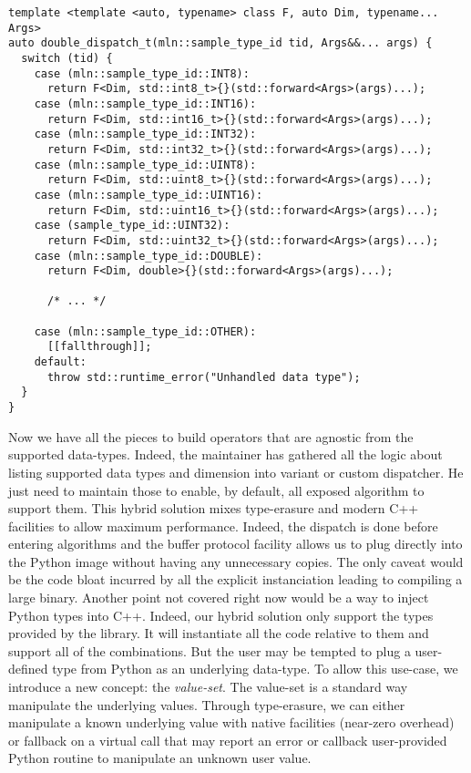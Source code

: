 \begin{verbatim}
template <template <auto, typename> class F, auto Dim, typename... Args>
auto double_dispatch_t(mln::sample_type_id tid, Args&&... args) {
  switch (tid) {
    case (mln::sample_type_id::INT8):
      return F<Dim, std::int8_t>{}(std::forward<Args>(args)...);
    case (mln::sample_type_id::INT16):
      return F<Dim, std::int16_t>{}(std::forward<Args>(args)...);
    case (mln::sample_type_id::INT32):
      return F<Dim, std::int32_t>{}(std::forward<Args>(args)...);
    case (mln::sample_type_id::UINT8):
      return F<Dim, std::uint8_t>{}(std::forward<Args>(args)...);
    case (mln::sample_type_id::UINT16):
      return F<Dim, std::uint16_t>{}(std::forward<Args>(args)...);
    case (sample_type_id::UINT32):
      return F<Dim, std::uint32_t>{}(std::forward<Args>(args)...);
    case (mln::sample_type_id::DOUBLE):
      return F<Dim, double>{}(std::forward<Args>(args)...);

      /* ... */

    case (mln::sample_type_id::OTHER):
      [[fallthrough]];
    default:
      throw std::runtime_error("Unhandled data type");
  }
}
\end{verbatim}

Now we have all the pieces to build operators that are agnostic from the supported data-types. Indeed, the maintainer
has gathered all the logic about listing supported data types and dimension into variant or custom dispatcher. He just
need to maintain those to enable, by default, all exposed algorithm to support them. This hybrid solution mixes
type-erasure and modern C++ facilities to allow maximum performance. Indeed, the dispatch is done before entering
algorithms and the buffer protocol facility allows us to plug directly into the Python image without having any
unnecessary copies. The only caveat would be the code bloat incurred by all the explicit instanciation leading to
compiling a large binary. Another point not covered right now would be a way to inject Python types into C++. Indeed,
our hybrid solution only support the types provided by the library. It will instantiate all the code relative to them
and support all of the combinations. But the user may be tempted to plug a user-defined type from Python as an
underlying data-type. To allow this use-case, we introduce a new concept: the \emph{value-set}. The value-set is a
standard way manipulate the underlying values. Through type-erasure, we can either manipulate a known underlying value
with native facilities (near-zero overhead) or fallback on a virtual call that may report an error or callback
user-provided Python routine to manipulate an unknown user value.


